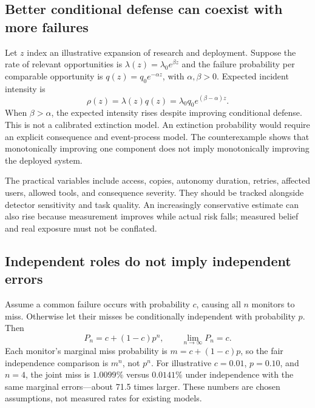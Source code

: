 \documentclass[10pt,twocolumn,letterpaper]{article}
\begin{document}
\subsection{Better conditional defense can coexist with more failures}
Let $z$ index an illustrative expansion of research and deployment. Suppose the rate of relevant opportunities is $\lambda(z)=\lambda_0e^{\beta z}$ and the failure probability per comparable opportunity is $q(z)=q_0e^{-\alpha z}$, with $\alpha,\beta>0$. Expected incident intensity is
\begin{equation}
\rho(z)=\lambda(z)q(z)=\lambda_0q_0e^{(\beta-\alpha)z}.
\label{eq:exposure}
\end{equation}
When $\beta>\alpha$, the expected intensity rises despite improving conditional defense. This is not a calibrated extinction model. An extinction probability would require an explicit consequence and event-process model. The counterexample shows that monotonically improving one component does not imply monotonically improving the deployed system.

The practical variables include access, copies, autonomy duration, retries, affected users, allowed tools, and consequence severity. They should be tracked alongside detector sensitivity and task quality. An increasingly conservative estimate can also rise because measurement improves while actual risk falls; measured belief and real exposure must not be conflated.

\subsection{Independent roles do not imply independent errors}
Assume a common failure occurs with probability $c$, causing all $n$ monitors to miss. Otherwise let their misses be conditionally independent with probability $p$. Then
\begin{equation}
P_n=c+(1-c)p^n,\qquad \lim_{n\to\infty}P_n=c.
\label{eq:common}
\end{equation}
Each monitor's marginal miss probability is $m=c+(1-c)p$, so the fair independence comparison is $m^n$, not $p^n$. For illustrative $c=0.01$, $p=0.10$, and $n=4$, the joint miss is $1.0099\%$ versus $0.0141\%$ under independence with the same marginal errors---about 71.5 times larger. These numbers are chosen assumptions, not measured rates for existing models.
\end{document}
